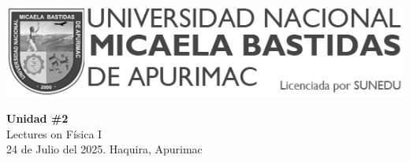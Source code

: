 

\begin{minipage}[l]{0.42\textwidth}
    \includegraphics[width=1\textwidth]{img/logo-UNAMBA.png}
\end{minipage}
\hfill
\begin{minipage}[c]{0.5\textwidth}
    \begin{flushright}
	\large{\textbf{Unidad \#2}}\\
	\large{Lectures on Física I}\\
	\large{24 de Julio del 2025. Haquira, Apurimac}\\
    \end{flushright}
\end{minipage}



